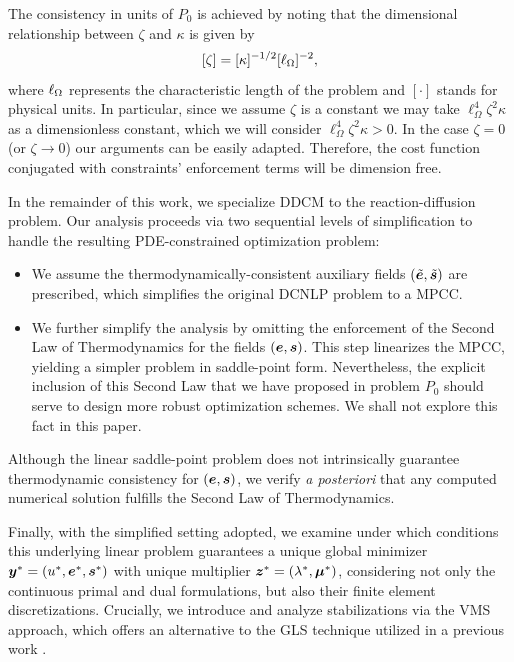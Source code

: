 \begin{remark}\label{rem2}
The consistency in units of $P_0$ is achieved by noting that the dimensional relationship between $\zeta$ and $\kappa$ is given by
$$
[\zeta] = [\kappa]^{-1/2}[\ell_\Omega]^{-2},
$$
where $\ell_\Omega$ represents the characteristic length of the problem and $[\cdot]$ stands for physical units. In particular, since we assume $\zeta$ is a constant we may take $\ell_\Omega^4 \zeta^2 \kappa$ as a dimensionless constant, which we will consider $\ell_\Omega^4 \zeta^2 \kappa > 0$. In the case $\zeta = 0$ (or $\zeta \to 0$) our arguments can be easily adapted. Therefore, the cost function conjugated with constraints' enforcement terms will be dimension free.      
\end{remark}

In the remainder of this work, we specialize DDCM to the reaction-diffusion problem. Our analysis proceeds via two sequential levels of simplification to handle the resulting PDE-constrained optimization problem:
\begin{itemize}
    \item We assume the thermodynamically-consistent auxiliary fields $(\tilde{\bm{e}},\tilde{\bm{s}})$ are prescribed, which simplifies the original DCNLP problem to a MPCC.
    \item We further simplify the analysis by omitting the enforcement of the Second Law of Thermodynamics for the fields $(\bm{e},\bm{s})$. This step linearizes the MPCC, yielding a simpler problem in saddle-point form. Nevertheless, the explicit inclusion of this Second Law that we have proposed in problem $P_0$ should serve to design more robust optimization schemes. We shall not explore this fact in this paper.
\end{itemize}
Although the linear saddle-point problem does not intrinsically guarantee thermodynamic consistency for $(\bm{e},\bm{s})$, we verify \textit{a posteriori} that any computed numerical solution fulfills the Second Law of Thermodynamics.

Finally, with the simplified setting adopted, we examine under which conditions this underlying linear problem guarantees a unique global minimizer $\bm{y}^*=(u^*,\bm{e}^*,\bm{s}^*)$ with unique multiplier $\bm{z}^
*=(\lambda^*,\bm{\mu}^*)$, considering not only the continuous primal and dual formulations, but also their finite element discretizations. Crucially, we introduce and analyze stabilizations via the VMS approach, which offers an alternative to the GLS technique utilized in a previous work \cite{Balbao2025}.
 

